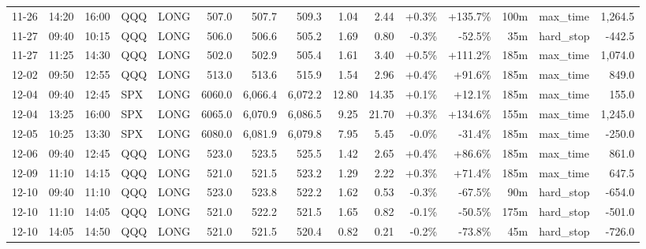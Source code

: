 \documentclass[11pt,a4paper,twoside]{article}
\begin{document}
\begin{landscape}
\begin{center}
\begin{longtable}{>{\color{txtmain}}l l l l l r r r r r r r r >{\color{txtmain}}l r}
11-26 & 14:20 & 16:00 & QQQ & LONG & 507.0 & 507.7 & 509.3 & 1.04 & 2.44 & \textcolor{wingreen}{+0.3\%} & \textcolor{wingreen}{+135.7\%} & 100m & max\_time & \textcolor{wingreen}{1,264.5} \\
11-27 & 09:40 & 10:15 & QQQ & LONG & 506.0 & 506.6 & 505.2 & 1.69 & 0.80 & \textcolor{lossred}{-0.3\%} & \textcolor{lossred}{-52.5\%} & 35m & hard\_stop & \textcolor{lossred}{-442.5} \\
11-27 & 11:25 & 14:30 & QQQ & LONG & 502.0 & 502.9 & 505.4 & 1.61 & 3.40 & \textcolor{wingreen}{+0.5\%} & \textcolor{wingreen}{+111.2\%} & 185m & max\_time & \textcolor{wingreen}{1,074.0} \\
12-02 & 09:50 & 12:55 & QQQ & LONG & 513.0 & 513.6 & 515.9 & 1.54 & 2.96 & \textcolor{wingreen}{+0.4\%} & \textcolor{wingreen}{+91.6\%} & 185m & max\_time & \textcolor{wingreen}{849.0} \\
12-04 & 09:40 & 12:45 & SPX & LONG & 6060.0 & 6,066.4 & 6,072.2 & 12.80 & 14.35 & \textcolor{wingreen}{+0.1\%} & \textcolor{wingreen}{+12.1\%} & 185m & max\_time & \textcolor{wingreen}{155.0} \\
12-04 & 13:25 & 16:00 & SPX & LONG & 6065.0 & 6,070.9 & 6,086.5 & 9.25 & 21.70 & \textcolor{wingreen}{+0.3\%} & \textcolor{wingreen}{+134.6\%} & 155m & max\_time & \textcolor{wingreen}{1,245.0} \\
12-05 & 10:25 & 13:30 & SPX & LONG & 6080.0 & 6,081.9 & 6,079.8 & 7.95 & 5.45 & \textcolor{lossred}{-0.0\%} & \textcolor{lossred}{-31.4\%} & 185m & max\_time & \textcolor{lossred}{-250.0} \\
12-06 & 09:40 & 12:45 & QQQ & LONG & 523.0 & 523.5 & 525.5 & 1.42 & 2.65 & \textcolor{wingreen}{+0.4\%} & \textcolor{wingreen}{+86.6\%} & 185m & max\_time & \textcolor{wingreen}{861.0} \\
12-09 & 11:10 & 14:15 & QQQ & LONG & 521.0 & 521.5 & 523.2 & 1.29 & 2.22 & \textcolor{wingreen}{+0.3\%} & \textcolor{wingreen}{+71.4\%} & 185m & max\_time & \textcolor{wingreen}{647.5} \\
12-10 & 09:40 & 11:10 & QQQ & LONG & 523.0 & 523.8 & 522.2 & 1.62 & 0.53 & \textcolor{lossred}{-0.3\%} & \textcolor{lossred}{-67.5\%} & 90m & hard\_stop & \textcolor{lossred}{-654.0} \\
12-10 & 11:10 & 14:05 & QQQ & LONG & 521.0 & 522.2 & 521.5 & 1.65 & 0.82 & \textcolor{lossred}{-0.1\%} & \textcolor{lossred}{-50.5\%} & 175m & hard\_stop & \textcolor{lossred}{-501.0} \\
12-10 & 14:05 & 14:50 & QQQ & LONG & 521.0 & 521.5 & 520.4 & 0.82 & 0.21 & \textcolor{lossred}{-0.2\%} & \textcolor{lossred}{-73.8\%} & 45m & hard\_stop & \textcolor{lossred}{-726.0} \\

\end{longtable}
\end{center}
\end{landscape}
\end{document}
